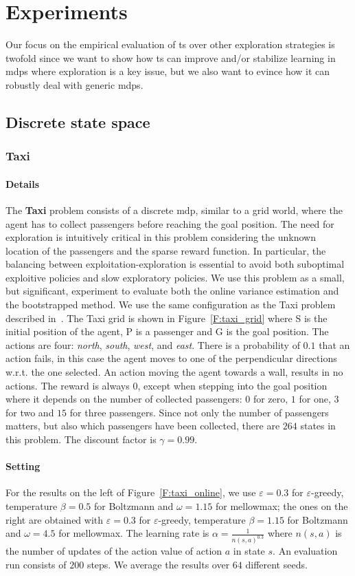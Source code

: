 \section{Experiments}
Our focus on the empirical evaluation of \gls{ts} over other exploration strategies is twofold since we want to show how \gls{ts} can improve and/or stabilize learning in \glspl{mdp} where exploration is a key issue, but we also want to evince how it can robustly deal with generic \glspl{mdp}.
\subsection{Discrete state space}
\subsubsection{Taxi}
\paragraph{Details} The \textbf{Taxi} problem consists of a discrete \gls{mdp}, similar to a grid world, where the agent has to collect passengers before reaching the goal position. The need for exploration is intuitively critical in this problem considering the unknown location of the passengers and the sparse reward function. In particular, the balancing between exploitation-exploration is essential to avoid both suboptimal exploitive policies and slow exploratory policies. We use this problem as a small, but significant, experiment to evaluate both the online variance estimation and the bootstrapped method. We use the same configuration as the Taxi problem described in~\cite{pmlr-v70-asadi17a}. The Taxi grid is shown in Figure~\ref{F:taxi_grid} where S is the initial position of the agent, P is a passenger and G is the goal position. The actions are four: \textit{north}, \textit{south}, \textit{west}, and \textit{east}. There is a probability of $0.1$ that an action fails, in this case the agent moves to one of the perpendicular directions w.r.t. the one selected. An action moving the agent towards a wall, results in no actions. The reward is always $0$, except when stepping into the goal position where it depends on the number of collected passengers: $0$ for zero, $1$ for one, $3$ for two and $15$ for three passengers. Since not only the number of passengers matters, but also which passengers have been collected, there are $264$ states in this problem. The discount factor is $\gamma = 0.99$.
\paragraph{Setting} For the results on the left of Figure~\ref{F:taxi_online}, we use $\varepsilon = 0.3$ for $\varepsilon$-greedy, temperature $\beta = 0.5$ for Boltzmann and $\omega = 1.15$ for mellowmax; the ones on the right are obtained with $\varepsilon = 0.3$ for $\varepsilon$-greedy, temperature $\beta = 1.15$ for Boltzmann and $\omega = 4.5$ for mellowmax. The learning rate is $\alpha = \frac{1}{n(s,a)^{0.3}}$ where $n(s,a)$ is the number of updates of the action value of action $a$ in state $s$. An evaluation run consists of $200$ steps. We average the results over $64$ different seeds.

